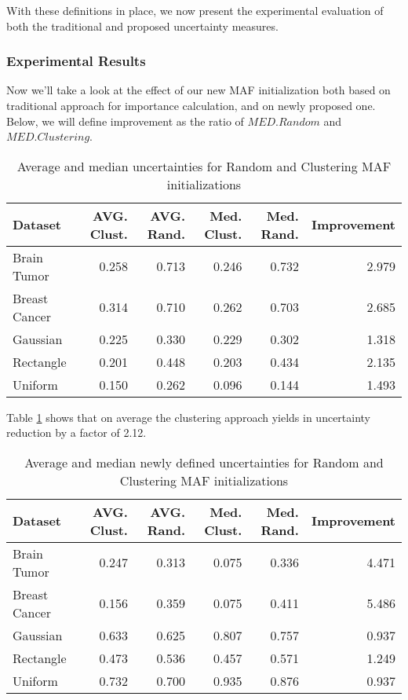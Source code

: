 \documentclass[10pt,a4paper,oneside]{article}
\begin{document}
{\color{red}With these definitions in place, we now present the experimental evaluation of both the traditional and proposed uncertainty measures.}

\subsubsection{Experimental Results}
Now we'll take a look at the effect of our new MAF initialization both based on traditional approach for importance calculation, and on newly proposed one. Below, we will define improvement as the ratio of $MED. Random$ and $MED. Clustering$.

\FloatBarrier

\begin{table}[htbp]
    \caption{Average and median uncertainties for Random and Clustering MAF initializations}
    \centering
    \label{unc-res}
    \begin{tabular}{l|r|r|r|r|r}
    \toprule
    Dataset & AVG. Clust. & AVG. Rand. & Med. Clust. & Med. Rand. & Improvement \\
    \midrule
    Brain Tumor & 0.258 & 0.713 & 0.246 & 0.732 & 2.979 \\
    Breast Cancer & 0.314 & 0.710 & 0.262 & 0.703 & 2.685 \\
    Gaussian & 0.225 & 0.330 & 0.229 & 0.302 & 1.318 \\
    Rectangle & 0.201 & 0.448 & 0.203 & 0.434 & 2.135 \\
    Uniform & 0.150 & 0.262 & 0.096 & 0.144 & 1.493 \\
    \bottomrule
    \end{tabular}
\end{table}
 Table \ref{unc-res} shows that on average the clustering approach yields in uncertainty reduction by a factor of 2.12.

\newpage
\FloatBarrier
\begin{table}[htbp]
    \caption{Average and median newly defined uncertainties for Random and Clustering MAF initializations}
    \centering
    \label{new-unce-res}
    \begin{tabular}{l|r|r|r|r|r}
    \toprule
    Dataset & AVG. Clust. & AVG. Rand. & Med. Clust. & Med. Rand. & Improvement \\
    \midrule
    Brain Tumor & 0.247 & 0.313 & 0.075 & 0.336 & 4.471 \\
    Breast Cancer & 0.156 & 0.359 & 0.075 & 0.411 & 5.486 \\
    Gaussian & 0.633 & 0.625 & 0.807 & 0.757 & 0.937 \\
    Rectangle & 0.473 & 0.536 & 0.457 & 0.571 & 1.249 \\
    Uniform & 0.732 & 0.700 & 0.935 & 0.876 & 0.937 \\
    \bottomrule
    \end{tabular}
    \label{tab:my_label}
\end{table}
\end{document}

